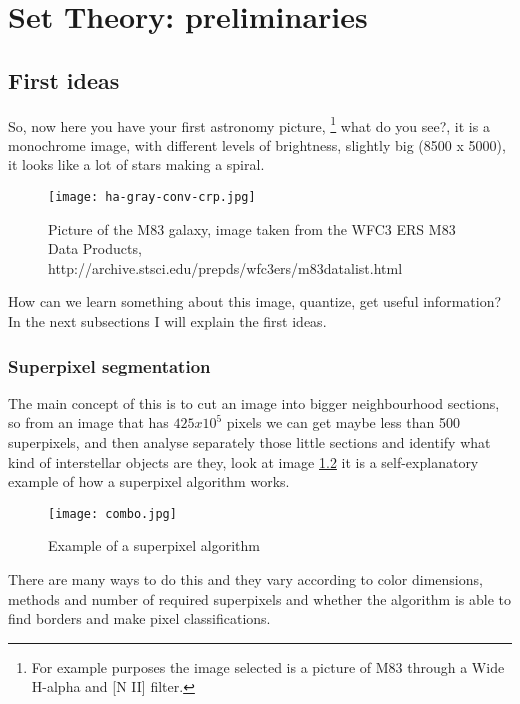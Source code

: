 \documentclass[11pt,fleqn]{book} %
\begin{document}



\chapter{Set Theory: preliminaries}

\section{First ideas}
So, now here you have your first astronomy picture, \footnote{For example purposes the image selected is a picture of M83 through a Wide H-alpha and [N II] filter. } what do you see?, it is a monochrome image, with different levels of brightness, slightly big (8500 x 5000), it looks like a lot of stars making a spiral.
\begin{figure}[h]
    \centering
    \texttt{[image: ha-gray-conv-crp.jpg]}
    \caption{Picture of the M83 galaxy, image taken from the WFC3 ERS M83 Data Products, http://archive.stsci.edu/prepds/wfc3ers/m83datalist.html}
    \label{fig:awesome_image}
\end{figure}

How can we learn something about this image, quantize, get useful information? In the next subsections I will explain the first ideas.

\subsection{Superpixel segmentation}
The main concept of this is to cut an image into bigger neighbourhood sections, so from an image that has $425x10^5$ pixels we can get maybe less than 500 superpixels, and then analyse separately those little sections and identify what kind of interstellar objects are they, look at image \ref{fig:super} it is a self-explanatory example of how a superpixel algorithm works.
\begin{figure}[h]
    \centering
    \texttt{[image: combo.jpg]}
    \caption{Example of a superpixel algorithm}
    \label{fig:super}
\end{figure}
There are many ways to do this and they vary according to color dimensions, methods and number of required superpixels and whether the algorithm is able to find borders and make pixel classifications.
\end{document}
